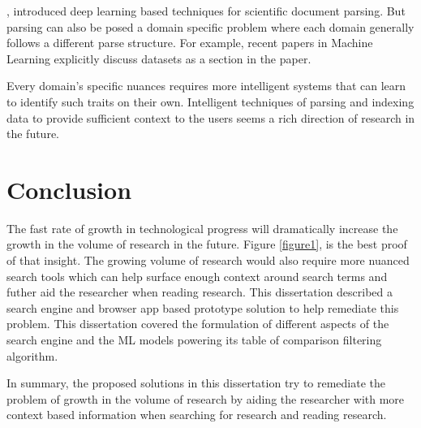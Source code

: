 \cite{kashyap2020sciwing}, introduced deep learning based techniques for scientific document parsing. But parsing can also be posed a domain specific problem where each domain generally follows a different parse structure. For example, recent papers in Machine Learning explicitly discuss datasets as a section in the paper.

Every domain's specific nuances requires more intelligent systems that can learn to identify such traits on their own. Intelligent techniques of parsing and indexing data to provide sufficient context to the users seems a rich direction of research in the future.

\section{Conclusion}
The fast rate of growth in technological progress will dramatically increase the growth in the volume of research in the future. Figure \ref{figure1}, is the best proof of that insight. The growing volume of research would also require more nuanced search tools which can help surface enough context around search terms and futher aid the researcher when reading research. This dissertation described a search engine and browser app based prototype solution to help remediate this problem. This dissertation covered the formulation of different aspects of the search engine and the ML models powering its table of comparison filtering algorithm. 

In summary, the proposed solutions in this dissertation try to remediate the problem of growth in the volume of research by aiding the researcher with more context based information when searching for research and reading research.